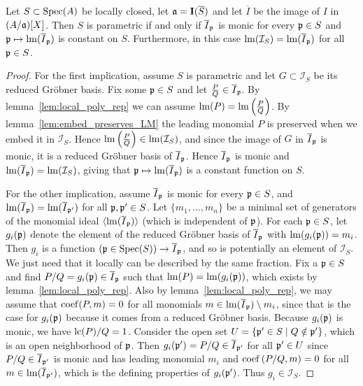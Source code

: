 \begin{theorem}\label{thm:para_iff_I_p_monic}
  Let $S \subset \operatorname{Spec}(A)$ be locally closed, let $\mathfrak{a} = \operatorname{\mathbf I}(\overline S)$ and let $\overline I$ be the image of $I$ in $(A/\mathfrak{a})[X]$. Then $S$ is parametric if and only if $\overline I_{\mathfrak p}$ is monic for every $\mathfrak p \in S$ and $\mathfrak p \mapsto \operatorname{lm}(\overline I_{\mathfrak p})$ is constant on $S$. Furthermore, in this case $\operatorname{lm}(\mathcal I_{S}) = \operatorname{lm}(\overline I_{\mathfrak p})$ for all $\mathfrak p \in S$.
\end{theorem}
\begin{proof}
  For the first implication, assume $S$ is parametric and let $G \subset \mathcal I_{S}$ be its reduced Gröbner basis. Fix some $\mathfrak p \in S$ and let $\frac P Q \in \overline I_{\mathfrak p}$. By lemma~\ref{lem:local_poly_rep} we can assume $\operatorname{lm}(P) = \operatorname{lm}\left(\frac P Q\right)$. By lemma~\ref{lem:embed_preserves_LM} the leading monomial $P$ is preserved when we embed it in $\mathcal I_{S}$. Hence $\operatorname{lm}\left(\frac P Q\right) \in \operatorname{lm}(\mathcal I_{S})$, and since the image of $G$ in $\overline I_{\mathfrak p}$ is monic, it is a reduced Gröbner basis of $\overline I_{\mathfrak p}$. Hence $\overline I_{\mathfrak p}$ is monic and $\operatorname{lm}(\overline I_{\mathfrak p}) = \operatorname{lm}(\mathcal I_{S})$, giving that $\mathfrak p \mapsto \operatorname{lm}(\overline I_{\mathfrak p})$ is a constant function on $S$.

  For the other implication, assume $\overline I_{\mathfrak p}$ is monic for every $\mathfrak p \in S$, and $\operatorname{lm}(\overline I_{\mathfrak p}) = \operatorname{lm}(\overline I_{\mathfrak p'})$ for all $\mathfrak p, \mathfrak p' \in S$. Let $\{m_{1}, \dots, m_{n}\}$ be a minimal set of generators of the monomial ideal $\langle \operatorname{lm}(\overline I_{\mathfrak p}) \rangle$ (which is independent of $\mathfrak p$). For each $\mathfrak p \in S$, let $g_{i}(\mathfrak p)$ denote the element of the reduced Gröbner basis of $\overline I_{\mathfrak p}$ with $\operatorname{lm}(g_{i}(\mathfrak p)) = m_{i}$. Then $g_{i}$ is a function $(\mathfrak p \in \operatorname{Spec}(S)) \to \overline I_{\mathfrak p}$, and so is potentially an element of $\mathcal I_{S}$. We just need that it locally can be described by the same fraction. Fix a $\mathfrak p \in S$ and find $P/Q = g_{i}(\mathfrak p) \in \overline I_{\mathfrak p}$ such that $\operatorname{lm}(P) = \operatorname{lm}(g_{i}(\mathfrak p))$, which exists by lemma~\ref{lem:local_poly_rep}. Also by lemma~\ref{lem:local_poly_rep}, we may assume that $\operatorname{coef}(P, m) = 0$ for all monomials $m \in \operatorname{lm}(\overline I_{\mathfrak p}) \setminus {m_{i}}$, since that is the case for $g_{i}(\mathfrak p)$ because it comes from a reduced Gröbner basis. Because $g_{i}(\mathfrak p)$ is monic, we have $\operatorname{lc}(P)/Q = 1$. Consider the open set $U = \{\mathfrak p' \in S \mid Q \notin \mathfrak p'\}$, which is an open neighborhood of $\mathfrak p$. Then $g_{i}(\mathfrak p') = P/Q \in \overline I_{\mathfrak p'}$ for all $\mathfrak p' \in U$ since $P/Q \in \overline I_{\mathfrak p'}$ is monic and has leading monomial $m_{i}$ and $\operatorname{coef}\left(P/Q, m\right) = 0$ for all $m \in \operatorname{lm}(\overline I_{\mathfrak p'})$, which is the defining properties of $g_{i}(\mathfrak p')$. Thus $g_{i} \in \mathcal I_{S}$.


\end{proof}

